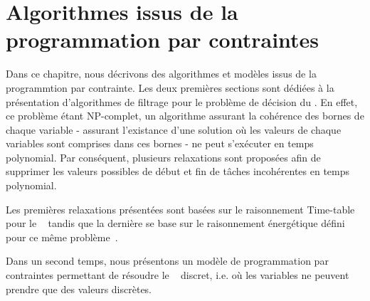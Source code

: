 \chapter{Algorithmes issus de la programmation par contraintes}
\label{sec:PPC_CECSP}
Dans ce chapitre, nous décrivons des algorithmes et modèles issus de
la programmtion par contrainte. Les deux premières sections sont
dédiées à la présentation d'algorithmes de filtrage pour le problème
de décision du \CECSP. En effet, ce problème étant NP-complet, un
algorithme assurant la cohérence des bornes de chaque variable -
assurant l'existance d'une solution où les valeurs de chaque 
variables sont comprises dans ces bornes - ne peut s'exécuter en temps
polynomial. Par conséquent, plusieurs relaxations sont proposées afin
de supprimer les valeurs possibles de début et fin de tâches
incohérentes en temps polynomial. 

Les premières relaxations présentées sont basées sur le raisonnement
Time-table pour le \CUSP~\cite{TTLah} tandis que la dernière se base
sur le raisonnement énergétique défini pour ce même
problème~\cite{RELopez}.

Dans un second temps, nous présentons un modèle de programmation par
contraintes permettant de résoudre le \CECSP~ discret, i.e. où les
variables ne peuvent prendre que des valeurs discrètes. 





